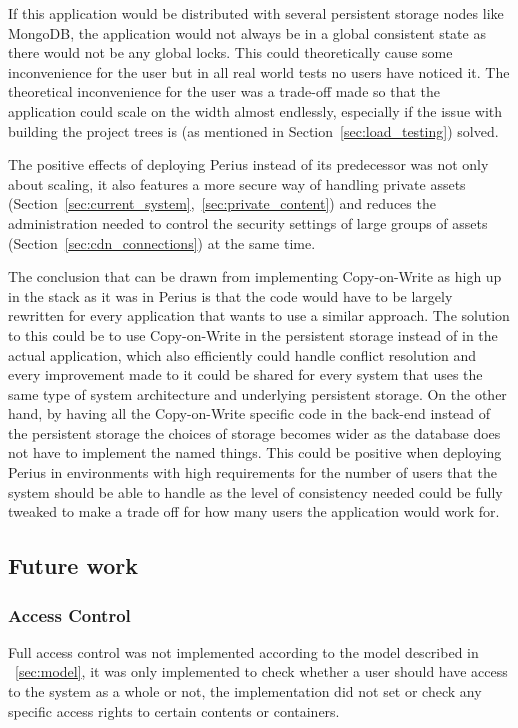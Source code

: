 \documentclass[a4paper,12pt]{article}
\begin{document}
\par If this application would be distributed with several persistent storage nodes like MongoDB,
the application would not always be in a global consistent state as there would not be any global
locks.  This could theoretically cause some inconvenience for the user but in all real world tests
no users have noticed it. The theoretical inconvenience for the user was a trade-off made so that
the application could scale on the width almost endlessly, especially if the issue with building the
project trees is (as mentioned in Section~\ref{sec:load_testing}) solved.

\par The positive effects of deploying Perius instead of its predecessor was not only about
scaling, it also features a more secure way of handling private assets 
(Section~\ref{sec:current_system},~\ref{sec:private_content}) and reduces the
administration needed to control the security settings of large groups of assets
(Section~\ref{sec:cdn_connections}) at the same time.

\par The conclusion that can be drawn from implementing Copy-on-Write as high up in the stack as it
was in Perius is that the code would have to be largely rewritten for every application that wants
to use a similar approach. The solution to this could be to use Copy-on-Write in the persistent
storage instead of in the actual application, which also efficiently could handle conflict 
resolution and every improvement made to it could be shared for every system that uses the same 
type of system architecture and underlying persistent storage. On the other hand, by having all the
Copy-on-Write specific code in the back-end instead of the persistent storage the choices of
storage becomes wider as the database does not have to implement the named things. This could be
positive when deploying Perius in environments with high requirements for the number of users
that the system should be able to handle as the level of consistency needed could be fully tweaked
to make a trade off for how many users the application would work for.

\subsection{Future work}
\subsubsection{Access Control}
Full access control was not implemented according to the model described in ~\ref{sec:model}, it
was only implemented to check whether a user should have access to the system as a whole or not, the
implementation did not set or check any specific access rights to certain contents or containers.
\end{document}
